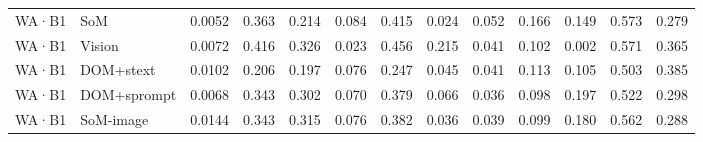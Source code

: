 \begin{table}[tp]
\begin{tabular}{@{}lllllllllllll@{}}
WA·B1 & SoM & 0.0052 & 0.363 & 0.214 & 0.084 & 0.415 & 0.024 & 0.052 & 0.166 & 0.149 & 0.573 & 0.279 \\
WA·B1 & Vision & 0.0072 & 0.416 & 0.326 & 0.023 & 0.456 & 0.215 & 0.041 & 0.102 & 0.002 & 0.571 & 0.365 \\
WA·B1 & DOM+stext & 0.0102 & 0.206 & 0.197 & 0.076 & 0.247 & 0.045 & 0.041 & 0.113 & 0.105 & 0.503 & 0.385 \\
WA·B1 & DOM+sprompt & 0.0068 & 0.343 & 0.302 & 0.070 & 0.379 & 0.066 & 0.036 & 0.098 & 0.197 & 0.522 & 0.298 \\
WA·B1 & SoM-image & 0.0144 & 0.343 & 0.315 & 0.076 & 0.382 & 0.036 & 0.039 & 0.099 & 0.180 & 0.562 & 0.288 \\
\bottomrule
\end{tabular}
\end{table}
